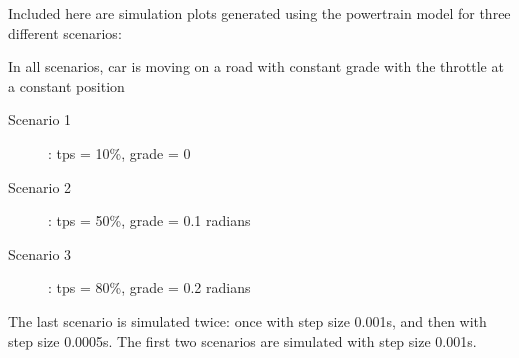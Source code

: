 \documentclass{seminar}
\begin{document}
\begin{slide}

Included here are simulation plots generated using the
powertrain model for three different scenarios:

In all scenarios, car is moving on a road with constant
grade with the throttle at a constant position

\begin{description}
\item[Scenario 1]: tps = 10\%, grade = 0
\item[Scenario 2]: tps = 50\%, grade = 0.1 radians
\item[Scenario 3]: tps = 80\%, grade = 0.2 radians
\end{description}

The last scenario is simulated twice:
once with step size 0.001s, and then with step size 0.0005s.
The first two scenarios are simulated with step size 0.001s.

\end{slide}
\end{document}
